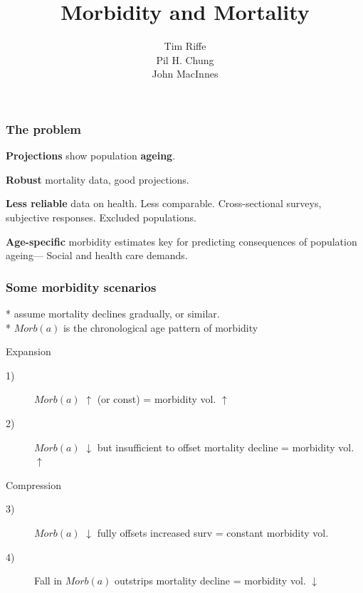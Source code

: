 \documentclass[20pt]{beamer}
\title{Morbidity and Mortality}
\subtitle{Tim Riffe\\ Pil H. Chung\\ John MacInnes}
\begin{document}
\begin{frame}
	\titlepage
\end{frame}

\begin{frame}%
\frametitle{The problem}
  \begin{description}
    \item<1->{\textbf{Projections}} show population \textbf{ageing}.
    \item<2->{\textbf{Robust}} mortality data, good projections.
    \item<3->{\textbf{Less reliable}} data on health. Less comparable.
    Cross-sectional surveys, subjective responses. Excluded populations.
    \item<4->{\textbf{Age-specific}} morbidity estimates key for predicting
    consequences of population ageing--- Social and health care demands.
  \end{description}
\end{frame}	



\begin{frame}
\frametitle{Some morbidity scenarios}
* assume mortality declines gradually, or similar.\\
* $Morb(a)$ is the chronological age pattern of morbidity
\begin{block}{Expansion}
\begin{description}
\item[1)] $Morb(a)$ $\uparrow$ (or
const) = morbidity vol. $\uparrow$
\item[2)] $Morb(a)$ $\downarrow$ but insufficient to offset mortality
                  decline = morbidity vol. $\uparrow$
\end{description}
\end{block}

\begin{block}{Compression}
\begin{description}
\item[3)]$Morb(a)$ $\downarrow$ fully offsets increased surv = constant morbidity
vol.
\item[4)] Fall in $Morb(a)$ outstrips mortality decline = morbidity vol. $\downarrow$
\end{description}
\end{block}

\end{frame}	
\end{document}
